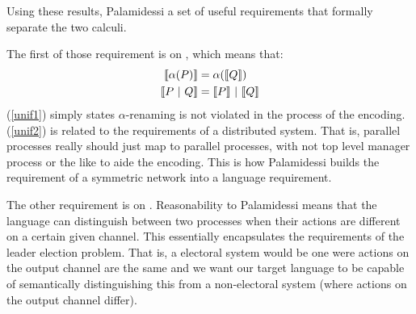 Using these results, Palamidessi a set of useful requirements that formally separate the two calculi.

The first of those requirement is on , which means that:
\begin{align}
	\llbracket{\alpha(P)}\rrbracket &= \alpha(\llbracket{Q}\rrbracket)\label{unif1}\\
	\llbracket{P \ensuremath{\ |\ } Q}\rrbracket &= \llbracket{P}\rrbracket \ |\  \llbracket{Q}\rrbracket\label{unif2}
\end{align}
(\ref{unif1}) simply states $\alpha$-renaming  is not violated in the process of the encoding.  (\ref{unif2}) is related to the requirements of a distributed system.  That is, parallel processes really should just map to parallel processes, with not top level manager process or the like to aide the encoding.  This is how Palamidessi builds the requirement of a symmetric network into a language requirement.

The other requirement is on .  Reasonability to Palamidessi means that the language can distinguish between two processes when their actions are different on a certain given channel.  This essentially encapsulates the requirements of the leader election problem.  That is, a electoral system would be one were actions on the output channel are the same and we want our target language to be capable of semantically distinguishing this from a non-electoral system (where actions on the output channel differ).